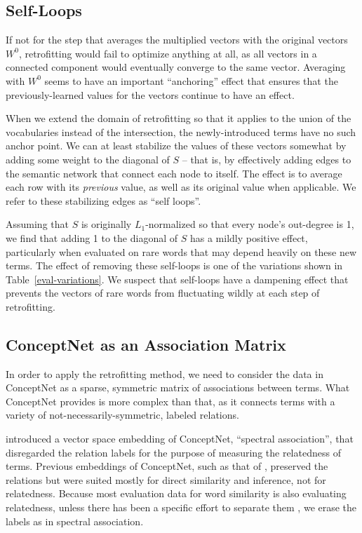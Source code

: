 \documentclass[letterpaper]{article}
\begin{document}
\subsection{Self-Loops}
If not for the step that averages the multiplied vectors with the original
vectors $W^0$, retrofitting would fail to optimize anything at all, as all
vectors in a connected component would eventually converge to the same vector.
Averaging with $W^0$ seems to have an important ``anchoring'' effect that
ensures that the previously-learned values for the vectors continue to have
an effect.

When we extend the domain of retrofitting so that it applies to the union of
the vocabularies instead of the intersection, the newly-introduced terms have
no such anchor point. We can at least stabilize the values of these vectors
somewhat by adding some weight to the diagonal of $S$ -- that is, by
effectively adding edges to the semantic network that connect each node to
itself. The effect is to average each row with its {\em previous} value, as
well as its original value when applicable. We refer to these stabilizing edges
as ``self loops''.

Assuming that $S$ is originally $L_1$-normalized so that every node's
out-degree is 1, we find that adding 1 to the diagonal of $S$ has a mildly
positive effect, particularly when evaluated on rare words that may depend
heavily on these new terms. The effect of removing these self-loops is one of
the variations shown in Table~\ref{eval-variations}.  We suspect that
self-loops have a dampening effect that prevents the vectors of rare words from
fluctuating wildly at each step of retrofitting.

\subsection{ConceptNet as an Association Matrix}

In order to apply the retrofitting method, we need to consider the data in
ConceptNet as a sparse, symmetric matrix of associations between terms. What
ConceptNet provides is more complex than that, as it connects terms with a
variety of not-necessarily-symmetric, labeled relations.

 introduced a vector space embedding of ConceptNet,
``spectral association'', that disregarded the relation labels for the purpose
of measuring the relatedness of terms. Previous embeddings of ConceptNet, such
as that of , preserved the relations but were
suited mostly for direct similarity and inference, not for relatedness. Because
most evaluation data for word similarity is also evaluating relatedness, unless
there has been a specific effort to separate them \cite{agirre2009similarity},
we erase the labels as in spectral association.
\end{document}
